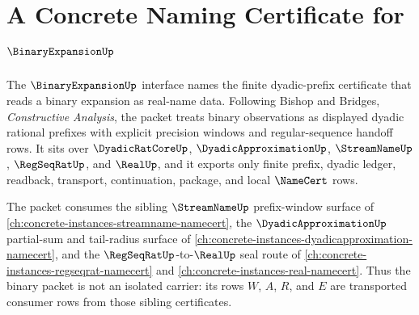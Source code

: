 \chapter{A Concrete Naming Certificate for $\BinaryExpansionUp$}
\label{ch:concrete-instances-binaryexpansion-namecert}

The $\BinaryExpansionUp$ interface names the finite dyadic-prefix certificate that reads a binary expansion as real-name data. Following Bishop and Bridges, \emph{Constructive Analysis}, the packet treats binary observations as displayed dyadic rational prefixes with explicit precision windows and regular-sequence handoff rows. It sits over $\DyadicRatCoreUp$, $\DyadicApproximationUp$, $\StreamNameUp$, $\RegSeqRatUp$, and $\RealUp$, and it exports only finite prefix, dyadic ledger, readback, transport, continuation, package, and local $\NameCert$ rows.

The packet consumes the sibling $\StreamNameUp$ prefix-window surface of \autoref{ch:concrete-instances-streamname-namecert}, the $\DyadicApproximationUp$ partial-sum and tail-radius surface of \autoref{ch:concrete-instances-dyadicapproximation-namecert}, and the $\RegSeqRatUp$-to-$\RealUp$ seal route of \autoref{ch:concrete-instances-regseqrat-namecert} and \autoref{ch:concrete-instances-real-namecert}. Thus the binary packet is not an isolated carrier: its rows $W$, $A$, $R$, and $E$ are transported consumer rows from those sibling certificates.

